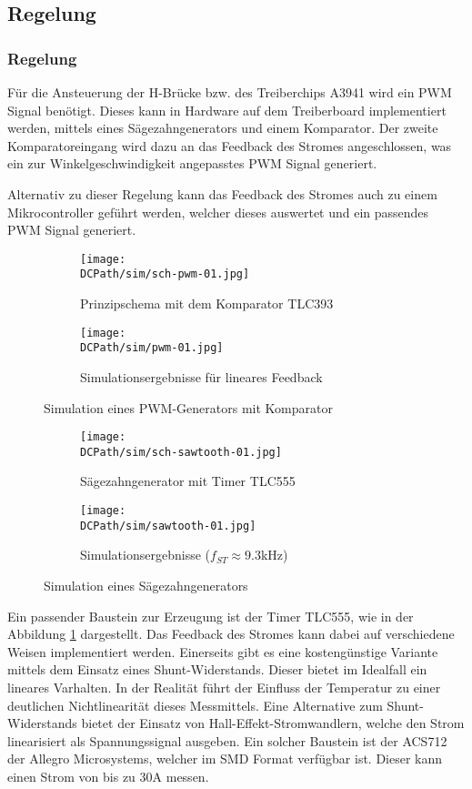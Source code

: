 \ifSTANDALONE
\subsection{Regelung}
\fi
\ifEMBED
\subsubsection{Regelung}
\fi
Für die Ansteuerung der H-Brücke bzw. des Treiberchips A3941 wird ein PWM
Signal benötigt. Dieses kann in Hardware auf dem Treiberboard implementiert
werden, mittels eines Sägezahngenerators und einem Komparator. Der zweite
Komparatoreingang wird dazu an das Feedback des Stromes angeschlossen, was
ein zur Winkelgeschwindigkeit angepasstes PWM Signal generiert.

\noindent Alternativ zu dieser Regelung kann das Feedback des Stromes auch zu 
einem Mikrocontroller geführt werden, welcher dieses auswertet und ein passendes
PWM Signal generiert.

\begin{figure}[h!]
    \centering
    \begin{subfigure}[b]{0.45\textwidth}
        \texttt{[image: \\DCPath/sim/sch-pwm-01.jpg]}
        \caption{Prinzipschema mit dem Komparator TLC393}
    \end{subfigure}
    \begin{subfigure}[b]{0.45\textwidth}
        \texttt{[image: \\DCPath/sim/pwm-01.jpg]}
        \caption{Simulationsergebnisse für lineares Feedback}
    \end{subfigure}
    \caption{Simulation eines PWM-Generators mit Komparator}
\end{figure}

\begin{figure}[h!]
    \centering
    \begin{subfigure}[b]{0.45\textwidth}
        \texttt{[image: \\DCPath/sim/sch-sawtooth-01.jpg]}
        \caption{Sägezahngenerator mit Timer TLC555}
    \end{subfigure}
    \begin{subfigure}[b]{0.45\textwidth}
        \texttt{[image: \\DCPath/sim/sawtooth-01.jpg]}
        \caption{Simulationsergebnisse ($f_{ST} \approx 9.3$kHz)}
    \end{subfigure}
    \caption{Simulation eines Sägezahngenerators}
    \label{fig:sawtooth}
\end{figure}

\noindent Ein passender Baustein zur Erzeugung ist der Timer TLC555, wie in der
Abbildung \ref{fig:sawtooth} dargestellt. Das Feedback des Stromes kann
dabei auf verschiedene Weisen implementiert werden. Einerseits gibt es eine
kostengünstige Variante mittels dem Einsatz eines Shunt-Widerstands. Dieser
bietet im Idealfall ein lineares Varhalten. In der Realität führt der
Einfluss der Temperatur zu einer deutlichen Nichtlinearität dieses
Messmittels. Eine Alternative zum Shunt-Widerstands bietet der Einsatz von
Hall-Effekt-Stromwandlern, welche den Strom linearisiert als Spannungssignal
ausgeben. Ein solcher Baustein ist der ACS712 der Allegro Microsystems,
welcher im SMD Format verfügbar ist. Dieser kann einen Strom von bis zu 
30\si{\ampere} messen.

